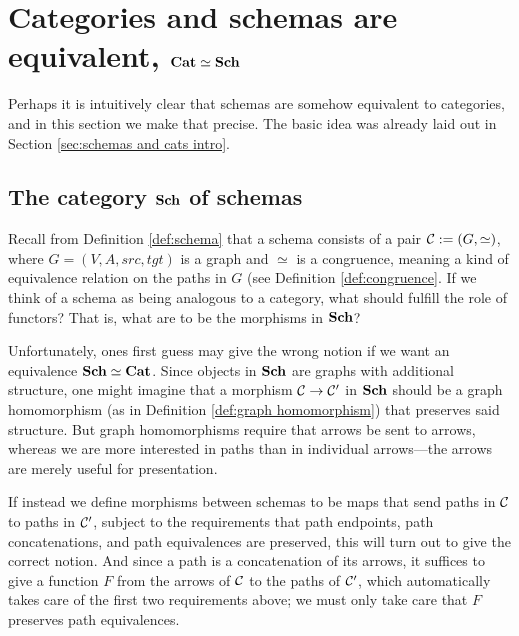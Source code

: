 

\section{Categories and schemas are equivalent, \texorpdfstring{${\bf Cat}\simeq{\bf Sch}$}{Cat = Sch}}\label{sec:cat equiv sch}

Perhaps it is intuitively clear that schemas are somehow equivalent to categories, and in this section we make that precise. The basic idea was already laid out in Section \ref{sec:schemas and cats intro}.


\subsection{The category ${\bf Sch}$ of schemas}\label{sec:sch as category}

Recall from Definition \ref{def:schema} that a schema consists of a pair $\mathcal{C}:=(G,\simeq)$, where $G=(V,A,src,tgt)$ is a graph and $\simeq$ is a congruence, meaning a kind of equivalence relation on the paths in $G$ (see Definition \ref{def:congruence}. If we think of a schema as being analogous to a category, what should fulfill the role of functors? That is, what are to be the morphisms in ${\bf Sch}$?

Unfortunately, ones first guess may give the wrong notion if we want an equivalence ${\bf Sch}\simeq{\bf Cat}$. Since objects in ${\bf Sch}$ are graphs with additional structure, one might imagine that a morphism $\mathcal{C}\rightarrow\mathcal{C}'$ in ${\bf Sch}$ should be a graph homomorphism (as in Definition \ref{def:graph homomorphism}) that preserves said structure. But graph homomorphisms require that arrows be sent to arrows, whereas we are more interested in paths than in individual arrows—the arrows are merely useful for presentation. 

If instead we define morphisms between schemas to be maps that send paths in $\mathcal{C}$ to paths in $\mathcal{C}'$, subject to the requirements that path endpoints, path concatenations, and path equivalences are preserved, this will turn out to give the correct notion. And since a path is a concatenation of its arrows, it suffices to give a function $F$ from the arrows of $\mathcal{C}$ to the paths of $\mathcal{C}'$, which automatically takes care of the first two requirements above; we must only take care that $F$ preserves path equivalences.

